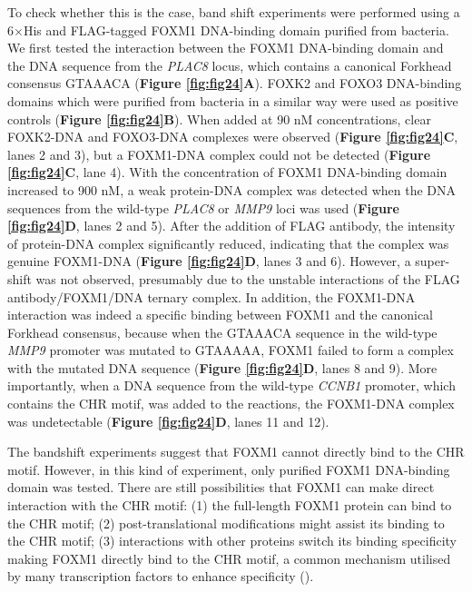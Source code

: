 To check whether this is the case, band shift experiments were performed using a 6$\times$His and FLAG-tagged FOXM1 DNA-binding domain purified from bacteria. We first tested the interaction between the FOXM1 DNA-binding domain and the DNA sequence from the \textit{PLAC8} locus, which contains a canonical Forkhead consensus GTAAACA (\textbf{Figure \ref{fig:fig24}A}). FOXK2 and FOXO3 DNA-binding domains which were purified from bacteria in a similar way were used as positive controls (\textbf{Figure \ref{fig:fig24}B}). When added at 90 nM concentrations, clear FOXK2-DNA and FOXO3-DNA complexes were observed (\textbf{Figure \ref{fig:fig24}C}, lanes 2 and 3), but a FOXM1-DNA complex could not be detected (\textbf{Figure \ref{fig:fig24}C}, lane 4). With the concentration of FOXM1 DNA-binding domain increased to 900 nM, a weak protein-DNA complex was detected when the DNA sequences from the wild-type \textit{PLAC8} or \textit{MMP9} loci was used (\textbf{Figure \ref{fig:fig24}D}, lanes 2 and 5). After the addition of FLAG antibody, the intensity of protein-DNA complex significantly reduced, indicating that the complex was genuine FOXM1-DNA (\textbf{Figure \ref{fig:fig24}D}, lanes 3 and 6). However, a super-shift was not observed, presumably due to the unstable interactions of the FLAG antibody/FOXM1/DNA ternary complex. In addition, the FOXM1-DNA interaction was indeed a specific binding between FOXM1 and the canonical Forkhead consensus, because when the GTAAACA sequence in the wild-type \textit{MMP9} promoter was mutated to GTAAAAA, FOXM1 failed to form a complex with the mutated DNA sequence (\textbf{Figure \ref{fig:fig24}D}, lanes 8 and 9). More importantly, when a DNA sequence from the wild-type \textit{CCNB1} promoter, which contains the CHR motif, was added to the reactions, the FOXM1-DNA complex was undetectable (\textbf{Figure \ref{fig:fig24}D}, lanes 11 and 12).

The bandshift experiments suggest that FOXM1 cannot directly bind to the CHR motif. However, in this kind of experiment, only purified FOXM1 DNA-binding domain was tested. There are still possibilities that FOXM1 can make direct interaction with the CHR motif: (1) the full-length FOXM1 protein can bind to the CHR motif; (2) post-translational modifications might assist its binding to the CHR motif; (3) interactions with other proteins switch its binding specificity making FOXM1 directly bind to the CHR motif, a common mechanism utilised by many transcription factors to enhance specificity (\cite{siggers2011non-dna-binding,slattery2011cofactor}).

